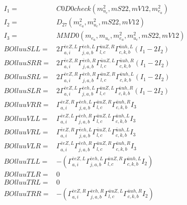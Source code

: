 \documentclass[A4,landscape]{article}
\begin{document}
\begin{align} 
I_1 = & C0D0check(m^2_{u_{{c}}}, mS22, mV12, m^2_{e_{{a}}}) \\ 
I_2 = & D_{27}(m^2_{e_{{a}}}, m^2_{u_{{c}}}, mS22, mV12) \\ 
I_3 = & MMD0(m_{e_{{a}}}, m_{u_{{c}}}, m^2_{e_{{a}}}, m^2_{u_{{c}}}, mS22, mV12) \\ 
  BOlluuSLL= & 2  \Gamma^{\bar{e}e Z ,L}_{a, i} \Gamma^{\bar{e}e h ,L}_{j, a, b} \Gamma^{\bar{u}u Z ,R}_{l, c} \Gamma^{\bar{u}u h ,L}_{c, k, b} (I_1 - 2 I_2) \\ 
  BOlluuSRR= & 2  \Gamma^{\bar{e}e Z ,R}_{a, i} \Gamma^{\bar{e}e h ,R}_{j, a, b} \Gamma^{\bar{u}u Z ,L}_{l, c} \Gamma^{\bar{u}u h ,R}_{c, k, b} (I_1 - 2 I_2) \\ 
  BOlluuSRL= & 2  \Gamma^{\bar{e}e Z ,R}_{a, i} \Gamma^{\bar{e}e h ,R}_{j, a, b} \Gamma^{\bar{u}u Z ,R}_{l, c} \Gamma^{\bar{u}u h ,L}_{c, k, b} (I_1 - 2 I_2) \\ 
  BOlluuSLR= & 2  \Gamma^{\bar{e}e Z ,L}_{a, i} \Gamma^{\bar{e}e h ,L}_{j, a, b} \Gamma^{\bar{u}u Z ,L}_{l, c} \Gamma^{\bar{u}u h ,R}_{c, k, b} (I_1 - 2 I_2) \\ 
  BOlluuVRR= &  \Gamma^{\bar{e}e Z ,R}_{a, i} \Gamma^{\bar{e}e h ,L}_{j, a, b} \Gamma^{\bar{u}u Z ,R}_{l, c} \Gamma^{\bar{u}u h ,R}_{c, k, b} I_3 \\ 
  BOlluuVLL= &  \Gamma^{\bar{e}e Z ,L}_{a, i} \Gamma^{\bar{e}e h ,R}_{j, a, b} \Gamma^{\bar{u}u Z ,L}_{l, c} \Gamma^{\bar{u}u h ,L}_{c, k, b} I_3 \\ 
  BOlluuVRL= &  \Gamma^{\bar{e}e Z ,R}_{a, i} \Gamma^{\bar{e}e h ,L}_{j, a, b} \Gamma^{\bar{u}u Z ,L}_{l, c} \Gamma^{\bar{u}u h ,L}_{c, k, b} I_3 \\ 
  BOlluuVLR= &  \Gamma^{\bar{e}e Z ,L}_{a, i} \Gamma^{\bar{e}e h ,R}_{j, a, b} \Gamma^{\bar{u}u Z ,R}_{l, c} \Gamma^{\bar{u}u h ,R}_{c, k, b} I_3 \\ 
  BOlluuTLL= & -( \Gamma^{\bar{e}e Z ,L}_{a, i} \Gamma^{\bar{e}e h ,L}_{j, a, b} \Gamma^{\bar{u}u Z ,R}_{l, c} \Gamma^{\bar{u}u h ,L}_{c, k, b} I_2) \\ 
  BOlluuTLR= & 0 \\ 
  BOlluuTRL= & 0 \\ 
  BOlluuTRR= & -( \Gamma^{\bar{e}e Z ,R}_{a, i} \Gamma^{\bar{e}e h ,R}_{j, a, b} \Gamma^{\bar{u}u Z ,L}_{l, c} \Gamma^{\bar{u}u h ,R}_{c, k, b} I_2) \\ 
\end{align} 
\end{document}

